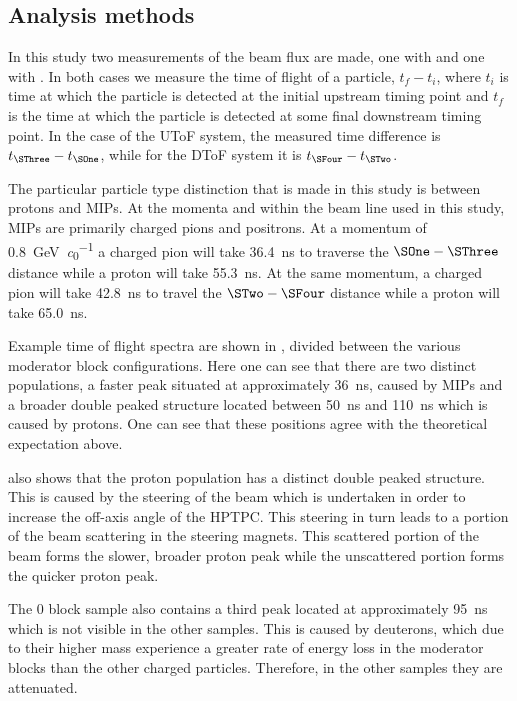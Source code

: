 \subsection{Analysis methods}
\label{sec:hptpc_beam_flux:methods:general}

In this study two measurements of the beam flux are made, one with \SThree and one with \SFour.
In both cases we measure the time of flight of a particle, $t_{f}-t_{i}$, where $t_{i}$ is time at which the particle is detected at the initial upstream timing point and $t_{f}$ is the time at which the particle is detected at some final downstream timing point.
In the case of the UToF system, the measured time difference is $t_{\SThree} - t_{\SOne}$, while for the DToF system it is $t_{\SFour} - t_{\STwo}$.

The particular particle type distinction that is made in this study is between protons and MIPs.
At the momenta and within the beam line used in this study, MIPs are primarily charged pions and positrons.
At a momentum of \SI{0.8}{\giga\electronvolt\per\clight} a charged pion will take \SI{36.4}{\nano\second} to traverse the $\SOne - \SThree$ distance while a proton will take \SI{55.3}{\nano\second}.
At the same momentum, a charged pion will take \SI{42.8}{\nano\second} to travel the $\STwo - \SFour$ distance while a proton will take \SI{65.0}{\nano\second}.

Example time of flight spectra are shown in , divided between the various moderator block configurations.
Here one can see that there are two distinct populations, a faster peak situated at approximately \SI{36}{\nano\second}, caused by MIPs and a broader double peaked structure located between \SI{50}{\nano\second} and \SI{110}{\nano\second} which is caused by protons.
One can see that these positions agree with the theoretical expectation above.

 also shows that the proton population has a distinct double peaked structure.
This is caused by the steering of the beam which is undertaken in order to increase the off-axis angle of the HPTPC.
This steering in turn leads to a portion of the beam scattering in the steering magnets.
This scattered portion of the beam forms the slower, broader proton peak while the unscattered portion forms the quicker proton peak.

The 0 block sample also contains a third peak located at approximately \SI{95}{\nano\second} which is not visible in the other samples.
This is caused by deuterons, which due to their higher mass experience a greater rate of energy loss in the moderator blocks than the other charged particles.
Therefore, in the other samples they are attenuated.

